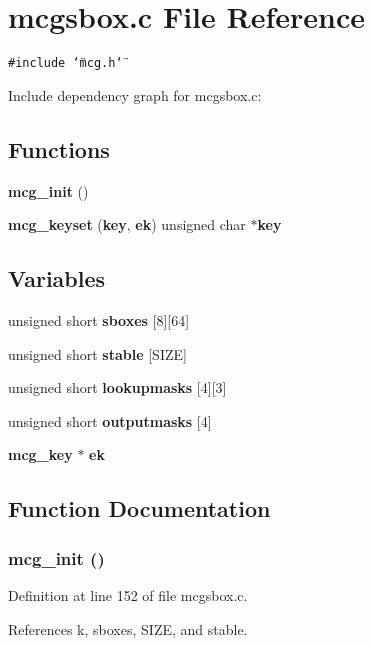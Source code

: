 \section{mcgsbox.c File Reference}
\label{mcgsbox_8c}


{\tt \#include \char`\"{}mcg.h\char`\"{}}\par


Include dependency graph for mcgsbox.c:\subsection*{Functions}
\begin{CompactItemize}
\item 
{\bf mcg\_\-init} ()
\item 
{\bf mcg\_\-keyset} ({\bf key}, {\bf ek}) unsigned char $\ast${\bf key}
\end{CompactItemize}
\subsection*{Variables}
\begin{CompactItemize}
\item 
unsigned short {\bf sboxes} [8][64]
\item 
unsigned short {\bf stable} [SIZE]
\item 
unsigned short {\bf lookupmasks} [4][3]
\item 
unsigned short {\bf outputmasks} [4]
\item 
{\bf mcg\_\-key} $\ast$ {\bf ek}
\end{CompactItemize}


\subsection{Function Documentation}
\subsubsection{\setlength{\rightskip}{0pt plus 5cm}mcg\_\-init ()}\label{mcgsbox_8c_a5}




Definition at line 152 of file mcgsbox.c.

References k, sboxes, SIZE, and stable.



